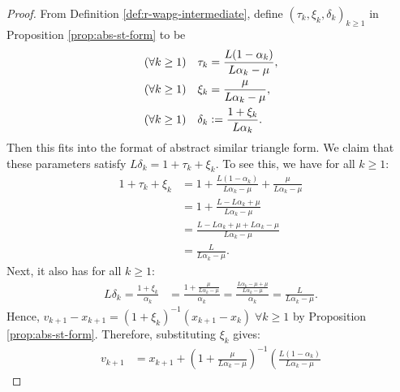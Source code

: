 \documentclass[12pt]{article}
\begin{document}
        \begin{proof}
            From Definition \ref{def:r-wapg-intermediate}, define $(\tau_k, \xi_k, \delta_k)_{k \ge 1}$ in Proposition \ref{prop:abs-st-form} to be
            \begin{align*}
                (\forall k \ge 1) \quad \tau_k &= \frac{L(1 - \alpha_k)}{L\alpha_k - \mu},
                \\
                (\forall k \ge 1)\quad 
                \xi_k &= \frac{\mu}{L \alpha_k - \mu},
                \\
                (\forall k \ge 1)\quad 
                \delta_k &\vcentcolon= \frac{1 + \xi_k}{L\alpha_k}. 
            \end{align*}
            Then this fits into the format of abstract similar triangle form. 
            We claim that these parameters satisfy $L\delta_k = 1 + \tau_k + \xi_k$. 
            To see this, we have for all $k\ge 1$: 
            \begin{align*}
                1 + \tau_k + \xi_k &= 
                1 + \frac{L(1 - \alpha_k)}{L \alpha_k - \mu} 
                + \frac{\mu}{L \alpha_k - \mu}
                \\
                &= 
                1 + \frac{L - L \alpha_k + \mu}{L\alpha_k - \mu}
                \\
                &= 
                \frac{L - L \alpha_k + \mu + L \alpha_k - \mu}{L\alpha_k - \mu}
                \\
                &= \frac{L}{L\alpha_k - \mu}. 
            \end{align*}
            Next, it also has for all $k \ge 1$: 
            \begin{align*}
                L\delta_k = \frac{1 + \xi_k}{\alpha_k}
                &= 
                \frac{1 + \frac{\mu}{L\alpha_k - \mu}}{\alpha_k}
                = 
                \frac{\frac{L\alpha_k - \mu + \mu}{L \alpha_k - \mu}}{\alpha_k}
                = 
                \frac{L}{L\alpha_k - \mu}.
            \end{align*}
            Hence,  $v_{k + 1} - x_{k + 1} = (1 + \xi_k)^{-1}(x_{k + 1} - x_k)\; \forall k \ge 1$ by Proposition \ref{prop:abs-st-form}.
            Therefore, substituting $\xi_k$ gives: 
            \begin{align*}
                v_{k + 1} &= 
                x_{k + 1} + \left(
                    1 + \frac{\mu}{L\alpha_k - \mu}
                \right)^{-1}\left(
                    \frac{L(1 - \alpha_k)}{L\alpha_k - \mu}

\end{align*}
\end{proof}
\end{document}
